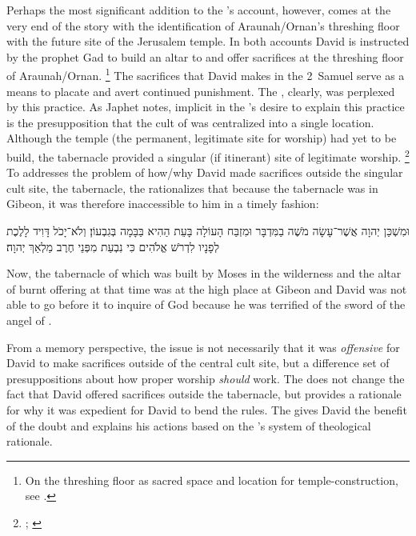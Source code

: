 Perhaps the most significant addition to the \chronicler's account, however, comes at the very end of the story with the identification of Araunah/Ornan's threshing floor with the future site of the Jerusalem temple. In both accounts David is instructed by the prophet Gad to build an altar to \yahweh and offer sacrifices at the threshing floor of Araunah/Ornan.%
    \footnote{On the threshing floor as  sacred space and location for temple-construction, see 
        \cite[125--144]{waters2015}.}
The sacrifices that David makes in the 2~Samuel serve as a means to placate \yahweh and avert continued punishment. The \chronicler, clearly, was perplexed by this practice. As Japhet notes, implicit in the \chronicler's desire to explain this practice is the presupposition that the cult of \yahweh was centralized into a single location. Although the temple (the permanent, legitimate site for worship) had yet to be build, the tabernacle provided a singular (if itinerant) site of legitimate worship.%
    \footnote{\cite[389]{japhet1993}; \cite[760--761]{knoppers2007}}
To addresses the problem of how/why David made sacrifices outside the singular cult site, the tabernacle, the \chronicler rationalizes that because the tabernacle was in Gibeon, it was therefore inaccessible to him in a timely fashion:
\begin{hebrewtext}
    וּמִשְׁכַּן יְהוָה אֲשֶׁר־עָשָׂה מֹשֶׁה בַמִּדְבָּר וּמִזְבַּח הָעוֹלָה בָּעֵת הַהִיא בַּבָּמָה בְּגִבְעוֹן׃ 
    וְלֹא־יָכֹל דָּוִיד לָלֶכֶת לְפָנָיו לִדְרֹשׁ אֱלֹהִים כִּי נִבְעַת מִפְּנֵי חֶרֶב מַלְאַךְ יְהוָה׃
\end{hebrewtext}
\begin{translation}
    Now, the tabernacle of \yahweh which was built by Moses in the wilderness and the altar of burnt offering at that time was at the high place at Gibeon
    and David was not able to go before it to inquire of God because he was terrified of the sword of the angel of \yahweh.
\end{translation}
\noindent
From a memory perspective, the issue is not necessarily that it was \emph{offensive} for David to make sacrifices outside of the central cult site, but a difference set of presuppositions about how proper worship \emph{should} work. The \chronicler does not change the fact that David offered sacrifices outside the tabernacle, but provides a rationale for why it was expedient for David to bend the rules. The \chronicler gives David the benefit of the doubt and explains his actions based on the \chronicler's system of theological rationale.

